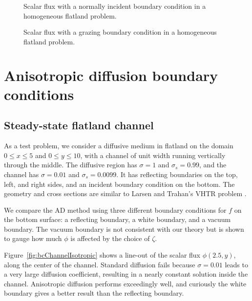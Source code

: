 \begin{figure}[htb!]
  \centering\small
  \hspace{-.5in}
  
  \hspace{-.5in}
  \caption{Scalar flux with a normally incident boundary condition in a
  homogeneous flatland problem.}
  \label{fig:delta}
\end{figure}

\begin{figure}[htb!]
  \centering\small
  \hspace{-.5in}
  
  \hspace{-.5in}
  \caption{Scalar flux with a grazing boundary condition in a homogeneous
  flatland problem.}
  \label{fig:grazing}
\end{figure}

\section{Anisotropic diffusion boundary conditions}

\subsection{Steady-state flatland channel}
As a test problem, we consider a diffusive medium in flatland on
the domain $0
\le x \le 5$ and $0 \le y \le 10$, with a channel of unit width running
vertically through the middle. The diffusive region has $\sigma=1$ and
$\sigma_s=0.99$, and the channel has $\sigma=0.01$ and $\sigma_s=0.0099$. It has
reflecting boundaries on the top, left, and right sides, and an incident
boundary condition on the bottom. The geometry and cross sections are similar to Larsen
and Trahan's VHTR problem \cite{Lar2009c}.

We compare the AD method using three different boundary conditions for $f$ on
the bottom surface: a reflecting boundary, a white boundary, and a vacuum
boundary. The vacuum boundary is not consistent with our theory but
is shown to gauge how much $\phi$ is affected by the choice of $\zeta$.

Figure~\ref{fig:bcChannelIsotropic} shows a line-out of the scalar flux
$\phi(2.5,y)$, along the center
of the channel. Standard diffusion fails because $\sigma=0.01$ leads to a very
large diffusion coefficient, resulting in a nearly constant solution inside the
channel. Anisotropic diffusion performs exceedingly well, and curiously the
white boundary gives a better result than the reflecting boundary.

